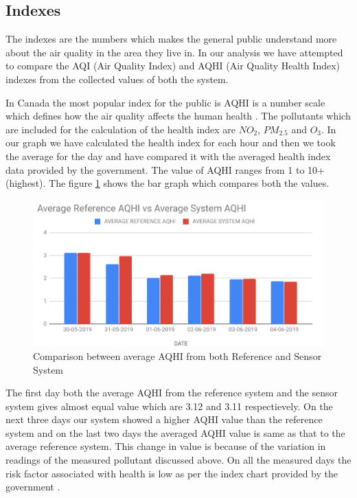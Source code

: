 \subsection{Indexes}

The indexes are the numbers which makes the general public understand more about the air quality in the area they live in. In our analysis we have attempted to compare the AQI (Air Quality Index) and AQHI (Air Quality Health Index) indexes from the collected values of both the system.

In Canada the most popular index for the public is AQHI is a number scale which defines how the air quality affects the human health \cite{AQHICAN}. The pollutants which are included for the calculation of the health index are $NO_{2}$, $PM_{2.5}$ and $O_{3}$. In our graph we have calculated the health index for each hour and then we took the average for the day and have compared it with the averaged health index data provided by the government. The value of AQHI ranges from 1 to 10+ (highest). The figure \ref{AQHIAV} shows the bar graph which compares both the values. 
\begin{figure}[h]
  \begin{center}
  \includegraphics[scale=0.70]{images/figure34.png}
  \end{center}
  \caption{Comparison between average AQHI from both Reference and Sensor System}
  \label{AQHIAV}
\end{figure}

 The first day both the average AQHI from the reference system and the sensor system gives almost equal value which are 3.12 and 3.11 respectievely. On the next three days our system showed a higher AQHI value than the reference system and on the last two days the averaged AQHI value is same as that to the average reference system. This change in value is because of the variation in readings of the measured pollutant discussed above. On all the measured days the risk factor associated with health is low as per the index chart provided by the government \cite{AQHICAN}.

